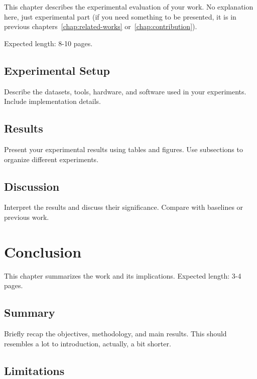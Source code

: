 \documentclass[12pt, a4paper]{report}
\begin{document}
This chapter describes the experimental evaluation of your work.
No explanation here, just experimental part (if you need something to be presented, 
it is in previous chapters~\ref{chap:related-works} or~\ref{chap:contribution}).

Expected length: 8-10 pages.

\section{Experimental Setup}
\label{sec:setup}

Describe the datasets, tools, hardware, and software used in your experiments. Include implementation details.

\section{Results}
\label{sec:results}

Present your experimental results using tables and figures. Use subsections to organize different experiments.

\section{Discussion}
\label{sec:discussion}

Interpret the results and discuss their significance. Compare with baselines or previous work.

\lipsum
\lipsum
\lipsum
\lipsum
\lipsum


\chapter{Conclusion}
\label{chap:conclusion}

This chapter summarizes the work and its implications.
Expected length: 3-4 pages.

\section{Summary}
\label{sec:summary}

Briefly recap the objectives, methodology, and main results. 
This should resembles a lot to introduction, actually, a bit shorter. 

\lipsum[1-2]

\section{Limitations}
\label{sec:limitations}
\end{document}

